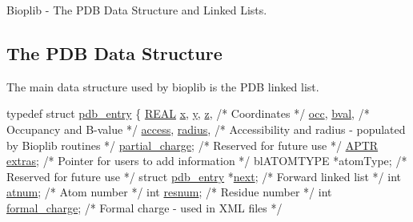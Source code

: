 Bioplib -\/ The P\-D\-B Data Structure and Linked Lists.

\subsection*{The P\-D\-B Data Structure }

The main data structure used by bioplib is the P\-D\-B linked list.


\begin{DoxyCode}
\textcolor{keyword}{typedef} \textcolor{keyword}{struct }\hyperlink{structpdb__entry}{pdb\_entry}
\{
   \hyperlink{_math_type_8h_a5821460e95a0800cf9f24c38915cbbde}{REAL} \hyperlink{structpdb__entry_ad14343030eb6dd7eb6a9c8b4c52fecb0}{x}, \hyperlink{structpdb__entry_a1aa467ce26c2e3301d0b78836e30cab0}{y}, \hyperlink{structpdb__entry_a9195b0e2ec564479b8a02cc3357410b7}{z},             \textcolor{comment}{/* Coordinates                             */}
        \hyperlink{structpdb__entry_aa16670bec839ae64c16b12fa90810973}{occ}, \hyperlink{structpdb__entry_ae02a474aa89a746f306e1fbd46bb8402}{bval},           \textcolor{comment}{/* Occupancy and B-value                   */}
        \hyperlink{structpdb__entry_a67301a56812fccd8b3aa6a172dd1e9d8}{access}, \hyperlink{structpdb__entry_adbb0a693780e69d9de0f58378fc1eb23}{radius},      \textcolor{comment}{/* Accessibility and radius - populated by}
\textcolor{comment}{                                Bioplib routines                        */}
        \hyperlink{structpdb__entry_a0b6d4737223c265ff150250aa2f3cd9c}{partial\_charge};      \textcolor{comment}{/* Reserved for future use                 */}
   \hyperlink{_sys_defs_8h_a201013872f88d6f535b12e644d7f4d5a}{APTR} \hyperlink{structpdb__entry_a65eaf0a41f0a5ac660c5fecad6d247b9}{extras};              \textcolor{comment}{/* Pointer for users to add information    */}
   blATOMTYPE *atomType;     \textcolor{comment}{/* Reserved for future use                 */}
   \textcolor{keyword}{struct }\hyperlink{structpdb__entry}{pdb\_entry} *\hyperlink{structpdb__entry_a9cc124a622ed031128bab9aac13f9145}{next};   \textcolor{comment}{/* Forward linked list                     */}
   \textcolor{keywordtype}{int}  \hyperlink{structpdb__entry_af0f05b6c256a3631c9735a45190bc2ae}{atnum};               \textcolor{comment}{/* Atom number                             */}
   \textcolor{keywordtype}{int}  \hyperlink{structpdb__entry_a7503a437042b8ae030eefb90decd7ceb}{resnum};              \textcolor{comment}{/* Residue number                          */}
   \textcolor{keywordtype}{int}  \hyperlink{structpdb__entry_a71dd94abbd2bc0399815e99bd3d42565}{formal\_charge};       \textcolor{comment}{/* Formal charge - used in XML files       */}

\end{DoxyCode}
